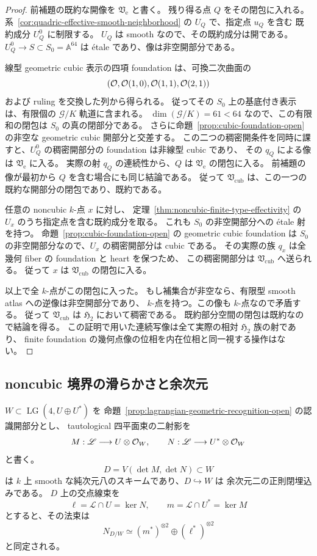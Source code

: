 \begin{proof}
前補題の既約な開像を $\mathfrak V_{\mathrm e}$ と書く。
残り得る点 $Q$ をその閉包に入れる。
系~\ref{cor:quadric-effective-smooth-neighborhood} の $U_Q$ で、指定点 $u_Q$ を含む
既約成分 $U_Q^0$ に制限する。
$U_Q$ は smooth なので、その既約成分は開である。
$U_Q^0\to S\subset S_0=\mathbb A^{64}$ は étale であり、像は非空開部分である。

線型 geometric cubic 表示の四項 foundation は、可換二次曲面の
\[
 (\mathcal O,\mathcal O(1,0),\mathcal O(1,1),\mathcal O(2,1))
\]
および ruling を交換した列から得られる。
従ってその $S_0$ 上の基底付き表示は、有限個の $\mathcal G/K$ 軌道に含まれる。
$\dim(\mathcal G/K)=61<64$ なので、この有限和の閉包は $S_0$ の真の閉部分である。
さらに命題~\ref{prop:cubic-foundation-open} の非空な geometric cubic 開部分と交差する。
この二つの稠密開条件を同時に課すと、$U_Q^0$ の稠密開部分の foundation は非線型 cubic であり、
その $q_Q$ による像は $\mathfrak V_{\mathrm e}$ に入る。
実際の射 $q_Q$ の連続性から、$Q$ は $\mathfrak V_{\mathrm e}$ の閉包に入る。
前補題の像が最初から $Q$ を含む場合にも同じ結論である。
従って $\mathfrak V_{\mathrm{cub}}$ は、この一つの既約な開部分の閉包であり、既約である。

任意の noncubic $k$-点 $x$ に対し、
定理~\ref{thm:noncubic-finite-type-effectivity} の $U_x$ のうち指定点を含む既約成分を取る。
これも $S_0$ の非空開部分への étale 射を持つ。
命題~\ref{prop:cubic-foundation-open} の geometric cubic foundation は
$S_0$ の非空開部分なので、$U_x$ の稠密開部分は cubic である。
その実際の族 $q_x$ は全幾何 fiber の foundation と heart を保つため、
この稠密開部分は $\mathfrak V_{\mathrm{cub}}$ へ送られる。
従って $x$ は $\mathfrak V_{\mathrm{cub}}$ の閉包に入る。

以上で全 $k$-点がこの閉包に入った。
もし補集合が非空なら、有限型 smooth atlas への逆像は非空開部分であり、
$k$-点を持つ。この像も $k$-点なので矛盾する。
従って $\mathfrak V_{\mathrm{cub}}$ は $\mathfrak H_2$ において稠密である。
既約部分空間の閉包は既約なので結論を得る。
この証明で用いた連続写像は全て実際の相対 $\mathfrak H_2$ 族の射であり、
finite foundation の幾何点像の位相を内在位相と同一視する操作はない。
\end{proof}

\subsection{noncubic 境界の滑らかさと余次元}

\begin{lemma}[二つの射影行列式の横断性]
\label{lem:lagrangian-boundary-transverse}
$W\subset\operatorname{LG}(4,U\oplus U^*)$ を
命題~\ref{prop:lagrangian-geometric-recognition-open} の認識開部分とし、
tautological 四平面束の二射影を
\[
 M:\mathscr L\longrightarrow U\otimes\mathcal O_W,
 \qquad N:\mathscr L\longrightarrow U^*\otimes\mathcal O_W
\]
と書く。
\[
 D=V(\det M,\det N)\subset W
\]
は $k$ 上 smooth な純次元八のスキームであり、$D\hookrightarrow W$ は
余次元二の正則閉埋込みである。
$D$ 上の交点線束を
\[
 \ell=\mathscr L\cap U=\ker N,\qquad
 m=\mathscr L\cap U^*=\ker M
\]
とすると、その法束は
\[
 N_{D/W}\simeq(m^*)^{\otimes2}\oplus(\ell^*)^{\otimes2}
 \tag{NC-boundary-normal}\label{eq:noncubic-boundary-normal}
\]
と同定される。
\end{lemma}

